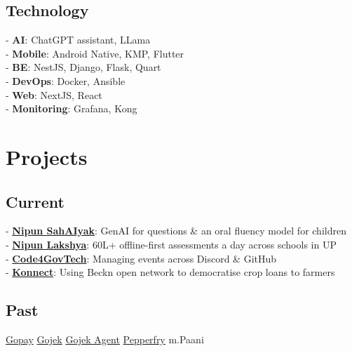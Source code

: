 \documentclass[]{deedy-resume-reversed}
\begin{document}
\begin{minipage}[t]{0.33\textwidth}
\subsection{Technology}
- {\bf AI}: ChatGPT assistant, LLama\\
- {\bf Mobile}: Android Native, KMP, Flutter \\ 
- {\bf BE}: NestJS, Django, Flask, Quart \\
- {\bf DevOps}: Docker, Ansible \\
- {\bf Web}: NextJS, React \\
- {\bf Monitoring}: Grafana, Kong \\
\sectionsep


\section{Projects}
\subsection{Current}
- \href{https://github.com/NipunSahAIyak}{{\bf Nipun SahAIyak}}: GenAI for questions \& an oral fluency model for children\\
- \href{https://github.com/Mission-Prerna}{{\bf Nipun Lakshya}}: 60L+ offline-first assessments a day across schools in UP\\
- \href{https://github.com/Code4GovTech}{{\bf Code4GovTech}}: Managing events across Discord \& GitHub\\
- \href{https://github.com/Konnect-Agri}{{\bf Konnect}}: Using Beckn open network to democratise crop loans to farmers
\sectionsep

\subsection{Past}
\href{https://play.google.com/store/apps/details?id=com.gojek.gopay&hl=en_IN}{Gopay} \textbullet{}
\href{https://play.google.com/store/apps/details?id=com.gojek.app&hl=en_IN}{Gojek} \textbullet{}
\href{https://play.google.com/store/apps/details?id=com.gojek.agent&hl=en_IN}{Gojek Agent} \textbullet{}
\href{https://play.google.com/store/apps/details?id=com.app.pepperfry&hl=en_IN}{Pepperfry} \textbullet{}
m.Paani\\



\end{minipage}
\end{document}
